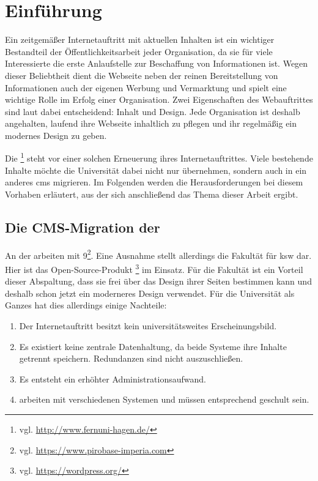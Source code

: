 \chapter{Einführung}
    \label{chapter:introduction}
    Ein zeitgemäßer Internetauftritt mit aktuellen Inhalten
    ist ein wichtiger Bestandteil der Öffentlichkeitsarbeit jeder Organisation,
    da sie für viele Interessierte die erste Anlaufstelle zur Beschaffung von Informationen ist.
    Wegen dieser Beliebtheit dient die Webseite neben der reinen Bereitstellung von Informationen
    auch der eigenen Werbung und Vermarktung und spielt eine wichtige Rolle im Erfolg einer Organisation.
    Zwei Eigenschaften des Webauftrittes sind laut \citet{sillence:onlineHealthSites} dabei
    entscheidend: Inhalt und Design.
    Jede Organisation ist deshalb angehalten, laufend ihre Webseite inhaltlich zu pflegen
    und ihr regelmäßig ein modernes Design zu geben.

    Die \fernUni\footnote{vgl. \url{http://www.fernuni-hagen.de/}}
    steht vor einer solchen Erneuerung ihres Internetauftrittes.
    Viele bestehende Inhalte möchte die Universität dabei nicht nur übernehmen,
    sondern auch in ein anderes \gls{cms} migrieren.
    Im Folgenden werden die Herausforderungen bei diesem Vorhaben erläutert,
    aus der sich anschließend das Thema dieser Arbeit ergibt.

    \section{Die CMS-Migration der \fernUni}
        \label{section:fernUniChallenges}
        An der {\fernUni} arbeiten {\editors} mit {\imperia} 9\footnote{vgl. \url{https://www.pirobase-imperia.com}}.
        Eine Ausnahme stellt allerdings die Fakultät für \gls{ksw} dar.
        Hier ist das Open-Source-Produkt {\wordpress}\footnote{vgl. \url{https://wordpress.org/}} im Einsatz.
        Für die Fakultät ist ein Vorteil dieser Abspaltung,
        dass sie frei über das Design ihrer Seiten bestimmen kann
        und deshalb schon jetzt ein moderneres Design verwendet.
        Für die Universität als Ganzes hat dies allerdings einige Nachteile:

        \begin{enumerate}
            \item   Der Internetauftritt besitzt kein universitätsweites Erscheinungsbild.
            \item   Es existiert keine zentrale Datenhaltung, da beide Systeme ihre Inhalte getrennt speichern.
                    Redundanzen sind nicht auszuschließen.
            \item   Es entsteht ein erhöhter Administrationsaufwand.
            \item   {\editors} arbeiten mit verschiedenen Systemen und müssen entsprechend geschult sein.
        \end{enumerate}

